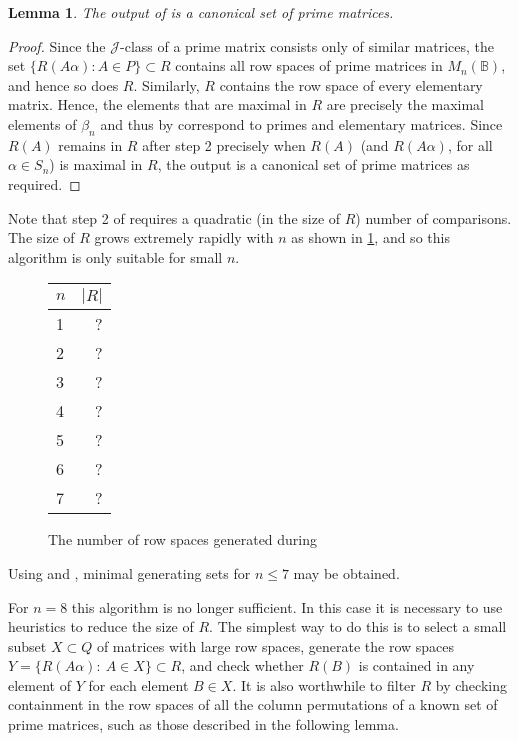 \documentclass[11pt]{article}
\newtheorem{lemma}[thm]{Lemma}
\numberwithin{equation}{section}
\newcommand{\set}[2]{\ensuremath{\{#1 : #2 \}}}
\newcommand{\B}{\mathbb{B}}
\newcommand{\Bn}{M_n(\B)}
\newcommand{\J}{\mathscr{J}}
\begin{document}
\begin{lemma}
  The output of  is a canonical set of prime matrices.
\end{lemma}
\begin{proof}
  Since the $\J$-class of a prime matrix consists only of similar matrices, the
  set $\set{R(A\alpha)}{A \in P} \subset R$ contains all row spaces of prime
  matrices in $\Bn$, and hence so does $R$. Similarly, $R$ contains the row
  space of every elementary matrix. Hence, the elements that are maximal in $R$
  are precisely the maximal elements of $\beta_n$ and thus by
   correspond to primes and elementary matrices.
  Since $R(A)$ remains in $R$ after step 2 precisely when $R(A)$ (and
  $R(A\alpha)$, for all $\alpha \in S_n$) is maximal in $R$, the output is a
  canonical set of prime matrices as required.
\end{proof} 

Note that step 2 of  requires a quadratic (in the size of
$R$) number of comparisons.
The size of $R$ grows extremely rapidly with $n$ as shown in
\ref{fig:filter1numbers}, and so this algorithm is only suitable for small $n$.
\begin{figure}
  \centering
  \begin{tabular}{l|r}
    $n$ & $|R|$ \\
    \hline
    1 & ?  \\ 
    2 & ?  \\ 
    3 & ?  \\ 
    4 & ?  \\
    5 & ?  \\
    6 & ?  \\ 
    7 & ?  \\ 
  \end{tabular}
\vspace{1cm}

\caption{The number of row spaces generated during } 
  \label{fig:filter1numbers}
\end{figure}

Using  and , minimal
generating sets for $n \leq 7$ may be obtained.

For $n=8$ this algorithm is no longer sufficient. In this case it is necessary
to use heuristics to reduce the size of $R$. The simplest way to do this is to
select a small subset $X \subset Q$ of matrices with large row spaces, generate
the row spaces $Y = \{R(A\alpha) :\: A \in X\} \subset R$, and check whether $R(B)$
is contained in any element of $Y$ for each element $B \in X$.
It is also worthwhile to filter $R$ by checking containment in the row spaces of
all the column permutations of a known set of prime matrices, such as those
described in the following lemma.
\end{document}
